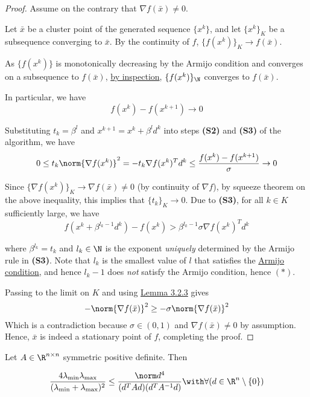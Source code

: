 \begin{proof}
	\def\xk{\{x^k\}}
	\def\grad#1{\nabla f(#1)}
	Assume on the contrary that $\grad{\bar x}\neq0$.

	Let $\bar x$ be a cluster point of the generated sequence $\xk$, and
	let $\xk_K$ be a subsequence converging to $\bar x$. By the
	continuity of $f$, $\{f(x^k)\}_K\to f(\bar x)$.

	As $\{f(x^k)\}$ is monotonically decreasing by the Armijo condition
	and converges on a subsequence to $f(\bar x)$, \href{aaf3ba6}{by
		inspection}, $\{f(x^k)\}_\N$ converges to $f(\bar x)$.

	In particular, we have
	$$f(x^k)-f(x^{k+1})\to0$$

	Substituting $t_k=\beta^l$ and $x^{k+1}=x^k+\beta^ld^k$ into steps
	\textbf{(S2)} and \textbf{(S3)} of the algorithm, we have
	$$
		0\leq
		t_k\norm{\grad{x^k}}^2=
		-t_k\grad{x^k}^Td^k\leq
		\frac{f(x^k)-f(x^{k+1})}\sigma\to0
	$$

	Since $\{\grad{x^k}\}_K\to\grad{\bar x}\neq0$ (by continuity of $\nabla
		f$), by squeeze theorem on the above inequality, this implies that
	$\{t_k\}_K\to0$. Due to \textbf{(S3)}, for all $k\in K$ sufficiently
	large, we have
	\begin{equation*}
		f(x^k+\beta^{l_k-1}d^k)-f(x^k)>\beta^{l_k-1}\sigma\grad{x^k}^Td^k\tag*{($*$)}
	\end{equation*}

	where $\beta^{l_k}=t_k$ and $l_k\in\N$ is the exponent
	\textit{uniquely} determined by the Armijo rule in \textbf{(S3)}.
	Note that $l_k$ is the smallest value of $l$ that satisfies the
	\href{fefb024}{Armijo condition}, and hence $l_k-1$ does \textit{not}
	satisfy the Armijo condition, hence $(*)$.

	Passing to the limit on $K$ and using \href{f8e1f12}{Lemma 3.2.3}
	gives
	$$
		-\norm{\nabla f(\bar x)}^2\geq-\sigma\norm{\nabla f(\bar x)}^2
	$$
	Which is a contradiction because $\sigma\in(0,1)$ and $\nabla f(\bar
		x)\neq0$ by assumption. Hence, $\bar x$ is indeed a stationary point
	of $f$, completing the proof.
\end{proof}

\label{eb4e630}

Let $A\in\R^{n\times n}$ symmetric positive definite. Then

\begin{equation*}
	\def\l{\lambda_{\min}}\def\L{\lambda_{\max}}
	\frac{4\l\L}{(\l+\L)^2}\leq\frac{\norm d^4}{(d^TAd)(d^TA^{-1}d)}
	\with\forall(d\in\R^n\setminus\{0\})
\end{equation*}

